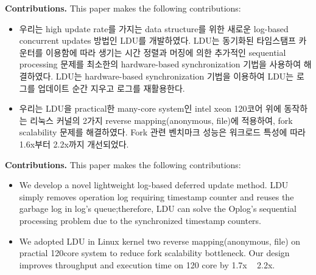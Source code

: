 \ifkor
\noindent
\textbf{Contributions.} This paper makes the following contributions:
\begin{itemize}
\item 우리는 high update rate를 가지는 data structure를 위한 새로운 log-based
concurrent updates 방법인 LDU를 개발하였다.
LDU는 동기화된 타임스탬프 카운터를 이용함에 따라 생기는 시간 정렬과 머징에 의한 추가적인 sequential processing 문제를
최소한의 hardware-based synchronization 기법을 사용하여 해결하였다.
LDU는 hardware-based synchronization 기법을 이용하여 LDU는 로그를 업데이트 순간 지우고 로그를 재활용한다.
\item 우리는 LDU을 practical한 many-core system인 intel xeon 120코어 위에 동작하는 리눅스 커널의
2가지 reverse mapping(anonymous, file)에 적용하여, fork scalability 문제를 해결하였다.
Fork 관련 벤치마크 성능은 워크로드 특성에 따라 1.6x부터 2.2x까지 개선되었다.
\end{itemize}
\else

\textbf{Contributions.} This paper makes the following contributions:
\begin{itemize}
\item We develop a novel lightweight log-based deferred update method.
LDU simply removes operation log requiring timestamp counter and
reuses the garbage log in log's queue;therefore, LDU can solve the Oplog's
sequential processing problem due to the synchronized timestamp counters.
\item 
We adopted LDU in Linux kernel two reverse mapping(anonymous, file) on practial
120core system to reduce fork scalability bottleneck.
Our design improves throughput and execution time on 120 core by 1.7x ~ 2.2x.
\end{itemize}

